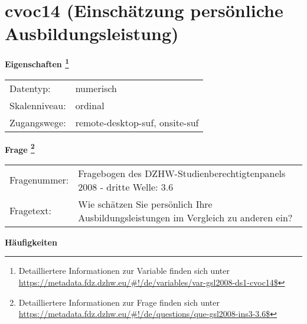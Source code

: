 
    \setcounter{footnote}{0}

    \vspace*{-1.8cm}
	\section{cvoc14 (Einschätzung persönliche Ausbildungsleistung)}
	\label{section:cvoc14}



    \vspace*{0.5cm}
    \noindent\textbf{Eigenschaften
	\footnote{Detailliertere Informationen zur Variable finden sich unter
		\url{https://metadata.fdz.dzhw.eu/\#!/de/variables/var-gsl2008-ds1-cvoc14$}}}\\
	\begin{tabularx}{\hsize}{@{}lX}
	Datentyp: & numerisch \\
	Skalenniveau: & ordinal \\
	Zugangswege: &
	  remote-desktop-suf, 
	  onsite-suf
 \\
    \end{tabularx}



				\vspace*{0.5cm}
                \noindent\textbf{Frage
	                \footnote{Detailliertere Informationen zur Frage finden sich unter
		              \url{https://metadata.fdz.dzhw.eu/\#!/de/questions/que-gsl2008-ins3-3.6$}}}\\
				\begin{tabularx}{\hsize}{@{}lX}
					Fragenummer: &
					  Fragebogen des DZHW-Studienberechtigtenpanels 2008 - dritte Welle:
					  3.6
 \\
					Fragetext: & Wie schätzen Sie persönlich Ihre Ausbildungsleistungen im Vergleich zu anderen ein? \\
				\end{tabularx}





        		\vspace*{0.5cm}
                \noindent\textbf{Häufigkeiten}

